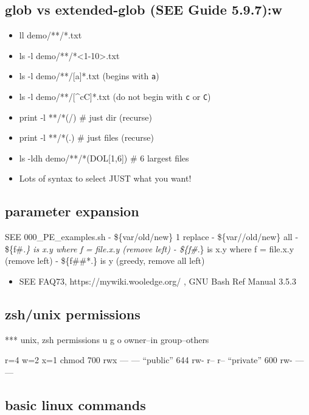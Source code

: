 \documentclass[
]{report}
\providecommand{\tightlist}{%
  \setlength{\itemsep}{0pt}\setlength{\parskip}{0pt}}\usepackage{longtable,booktabs,array}
\begin{document}
\subsection{glob vs extended-glob (SEE Guide
5.9.7):w}\label{glob-vs-extended-glob-see-guide-5.9.7w}

\begin{itemize}
\tightlist
\item
  ll demo/**/*.txt
\item
  ls -l demo/**/*\textless1-10\textgreater.txt
\item
  ls -l demo/**/{[}a{]}*.txt (begins with \texttt{a})
\item
  ls -l demo/**/{[}\^{}cC{]}*.txt (do not begin with \texttt{c} or
  \texttt{C})
\item
  print -l **/*(/) \# just dir (recurse)
\item
  print -l **/*(.) \# just files (recurse)
\item
  ls -ldh demo/**/*(DOL{[}1,6{]}) \# 6 largest files
\item
  Lots of syntax to select JUST what you want!
\end{itemize}

\subsection{parameter expansion}\label{parameter-expansion}

SEE 000\_PE\_examples.sh - \$\{var/old/new\} 1 replace -
\$\{var//old/new\} all - \$\{f\#\emph{.\} is x.y where f = file.x.y
(remove left) - \$\{f\#}.\} is x.y where f = file.x.y (remove left) -
\$\{f\#\#*.\} is y (greedy, remove all left)

\begin{itemize}
\tightlist
\item
  SEE FAQ73, https://mywiki.wooledge.org/ , GNU Bash Ref Manual 3.5.3
\end{itemize}

\subsection{zsh/unix permissions}\label{zshunix-permissions}

*** unix, zsh permissions u g o owner--in group--others

r=4 w=2 x=1 chmod 700 rwx --- --- ``public'' 644 rw- r-- r-- ``private''
600 rw- --- ---

\subsection{basic linux commands}\label{basic-linux-commands}
\end{document}
